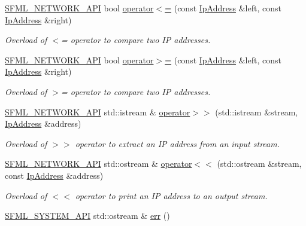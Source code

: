 \begin{DoxyCompactItemize}
\hyperlink{_network_2_export_8hpp_ac5d46d4ffd98e947e28c54d051b338e7}{S\-F\-M\-L\-\_\-\-N\-E\-T\-W\-O\-R\-K\-\_\-\-A\-P\-I} bool \hyperlink{namespacesf_aeb411e03dd15af718fe95ed4626190ad}{operator$<$=} (const \hyperlink{classsf_1_1_ip_address}{Ip\-Address} \&left, const \hyperlink{classsf_1_1_ip_address}{Ip\-Address} \&right)
\begin{DoxyCompactList}\small\item\em Overload of $<$= operator to compare two I\-P addresses. \end{DoxyCompactList}\item 
\hyperlink{_network_2_export_8hpp_ac5d46d4ffd98e947e28c54d051b338e7}{S\-F\-M\-L\-\_\-\-N\-E\-T\-W\-O\-R\-K\-\_\-\-A\-P\-I} bool \hyperlink{namespacesf_a457fb40b390861abae4234f6059d1c48}{operator$>$=} (const \hyperlink{classsf_1_1_ip_address}{Ip\-Address} \&left, const \hyperlink{classsf_1_1_ip_address}{Ip\-Address} \&right)
\begin{DoxyCompactList}\small\item\em Overload of $>$= operator to compare two I\-P addresses. \end{DoxyCompactList}\item 
\hyperlink{_network_2_export_8hpp_ac5d46d4ffd98e947e28c54d051b338e7}{S\-F\-M\-L\-\_\-\-N\-E\-T\-W\-O\-R\-K\-\_\-\-A\-P\-I} std\-::istream \& \hyperlink{namespacesf_a98b48ee7922e92d2f506800899bb66f6}{operator$>$$>$} (std\-::istream \&stream, \hyperlink{classsf_1_1_ip_address}{Ip\-Address} \&address)
\begin{DoxyCompactList}\small\item\em Overload of $>$$>$ operator to extract an I\-P address from an input stream. \end{DoxyCompactList}\item 
\hyperlink{_network_2_export_8hpp_ac5d46d4ffd98e947e28c54d051b338e7}{S\-F\-M\-L\-\_\-\-N\-E\-T\-W\-O\-R\-K\-\_\-\-A\-P\-I} std\-::ostream \& \hyperlink{namespacesf_afccb9f2356db23382bba2947d94e8553}{operator$<$$<$} (std\-::ostream \&stream, const \hyperlink{classsf_1_1_ip_address}{Ip\-Address} \&address)
\begin{DoxyCompactList}\small\item\em Overload of $<$$<$ operator to print an I\-P address to an output stream. \end{DoxyCompactList}\item 
\hyperlink{_system_2_export_8hpp_a6476c9e422606477a4c23d92b1d79a1f}{S\-F\-M\-L\-\_\-\-S\-Y\-S\-T\-E\-M\-\_\-\-A\-P\-I} std\-::ostream \& \hyperlink{group__system_ga7fe7f475639e26334606b5142c29551f}{err} ()

\end{DoxyCompactItemize}
